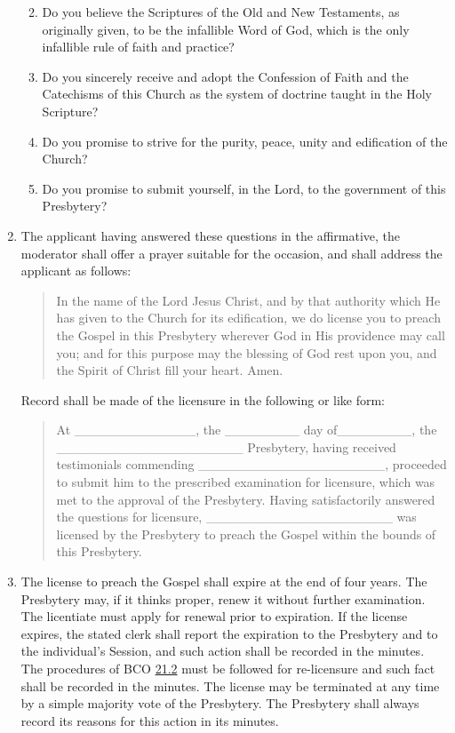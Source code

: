 \documentclass[
]{book}
\providecommand{\tightlist}{%
  \setlength{\itemsep}{0pt}\setlength{\parskip}{0pt}}
\begin{document}
\begin{enumerate}
  \begin{enumerate}
  \def\labelenumii{\alph{enumii}.}
  \tightlist
  \item
    Do you believe the Scriptures of the Old and New Testaments, as originally given, to be the infallible Word of God, which is the only infallible rule of faith and practice?
  \item
    Do you sincerely receive and adopt the Confession of Faith and the Catechisms of this Church as the system of doctrine taught in the Holy Scripture?
  \item
    Do you promise to strive for the purity, peace, unity and edification of the Church?
  \item
    Do you promise to submit yourself, in the Lord, to the government of this Presbytery?
  \end{enumerate}
\item
  The applicant having answered these questions in the affirmative, the moderator shall offer a prayer suitable for the occasion, and shall address the applicant as follows:

  \begin{quote}
  In the name of the Lord Jesus Christ, and by that authority which He has given to the Church for its edification, we do license you to preach the Gospel in this Presbytery wherever God in His providence may call you; and for this purpose may the blessing of God rest upon you, and the Spirit of Christ fill your heart. Amen.
  \end{quote}

  Record shall be made of the licensure in the following or like form:

  \begin{quote}
  At \_\_\_\_\_\_\_\_\_\_\_\_\_, the \_\_\_\_\_\_\_\_ day of\_\_\_\_\_\_\_\_, the \_\_\_\_\_\_\_\_\_\_\_\_\_\_\_\_\_\_\_\_ Presbytery, having received testimonials commending \_\_\_\_\_\_\_\_\_\_\_\_\_\_\_\_\_\_\_\_, proceeded to submit him to the prescribed examination for licensure, which was met to the approval of the Presbytery. Having satisfactorily answered the questions for licensure, \_\_\_\_\_\_\_\_\_\_\_\_\_\_\_\_\_\_\_\_ was licensed by the Presbytery to preach the Gospel within the bounds of this Presbytery.
  \end{quote}
\item
  The license to preach the Gospel shall expire at the end of four years. The Presbytery may, if it thinks proper, renew it without further examination. The licentiate must apply for renewal prior to expiration. If the license expires, the stated clerk shall report the expiration to the Presbytery and to the individual's Session, and such action shall be recorded in the minutes. The procedures of BCO \protect\hyperlink{21.2}{21.2} must be followed for re-licensure and such fact shall be recorded in the minutes. The license may be terminated at any time by a simple majority vote of the Presbytery. The Presbytery shall always record its reasons for this action in its minutes.
\end{enumerate}
\end{document}
